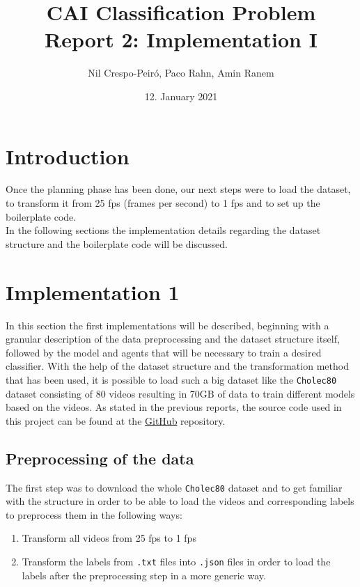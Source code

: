 \documentclass{article}
\title{CAI Classification Problem\\Report 2: Implementation I}
\author{Nil Crespo-Peiró, Paco Rahn, Amin Ranem}
\date{12. January 2021}
\begin{document}
\maketitle

\section{Introduction}
Once the planning phase has been done, our next steps were to load the dataset, to transform it from 25 fps (frames per second) to 1 fps and to set up the boilerplate code.\\
\noindent
In the following sections the implementation details regarding the dataset structure and the boilerplate code will be discussed.\\

\section{Implementation 1}
In this section the first implementations will be described, beginning with a granular description of the data preprocessing and the dataset structure itself, followed by the model and agents that will be necessary to train a desired classifier. With the help of the dataset structure and the transformation method that has been used, it is possible to load such a big dataset like the \texttt{Cholec80} dataset consisting of 80 videos resulting in 70GB of data to train different models based on the videos. As stated in the previous reports, the source code used in this project can be found at the \href{https://github.com/amrane99/CAI-Classification/tree/main}{GitHub} repository.

\subsection{Preprocessing of the data}
The first step was to download the whole \texttt{Cholec80} dataset and to get familiar with the structure in order to be able to load the videos and corresponding labels to preprocess them in the following ways:
\begin{enumerate}
    \item Transform all videos from 25 fps to 1 fps
    \item Transform the labels from \texttt{.txt} files into \texttt{.json} files in order to load the labels after the preprocessing step in a more generic way. 
\end{enumerate}
\end{document}
